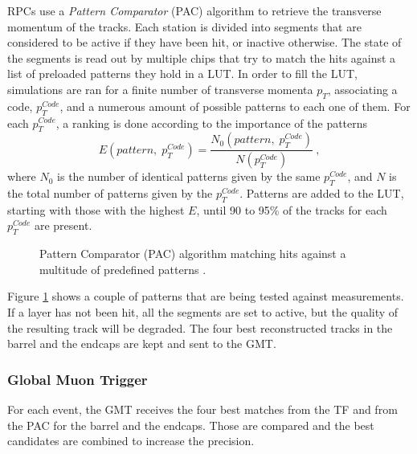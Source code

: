     				RPCs use a \emph{Pattern Comparator} (PAC) algorithm \Cite{These_Karol} to retrieve the transverse momentum of the tracks. Each station is divided into segments that are considered to be active if they have been hit, or inactive otherwise. The state of the segments is read out by multiple chips that try to match the hits against a list of preloaded patterns they hold in a LUT. In order to fill the LUT, simulations are ran for a finite number of transverse momenta $ p_T $, associating a code, $ p_T^{Code} $, and a numerous amount of possible patterns to each one of them. For each $ p_T^{Code} $, a ranking is done according to the importance of the patterns
    				\begin{equation}
    					E(pattern, \; p_T^{Code}) = \frac{N_0(pattern, \; p_T^{Code})}{N(p_T^{Code})} \ ,
    				\end{equation}
    				where $ N_0 $ is the number of identical patterns given by the same $ p_T^{Code} $, and $ N $ is the total number of patterns given by the $ p_T^{Code} $. Patterns are added to the LUT, starting with those with the highest $ E $, until 90 to 95\% of the tracks for each $ p_T^{Code} $ are present. \\

    				\begin{figure}[h!]
    					\centering
    					\caption{Pattern Comparator (PAC) algorithm matching hits against a multitude of predefined patterns \Cite{These_Karol}.}
    					\label{fig:trigger_system_and_reconstruction_algorithms__rpc}
    				\end{figure}

    				Figure \ref{fig:trigger_system_and_reconstruction_algorithms__rpc} shows a couple of patterns that are being tested against measurements. If a layer has not been hit, all the segments are set to active, but the quality of the resulting track will be degraded. The four best reconstructed tracks in the barrel and the endcaps are kept and sent to the GMT.

    			\subsubsection{Global Muon Trigger}
    			\label{sec:trigger_system_and_reconstruction_algorithms__global_muon_trigger}

    				For each event, the GMT receives the four best matches from the TF and from the PAC for the barrel and the endcaps. Those are compared and the best candidates are combined to increase the precision.

